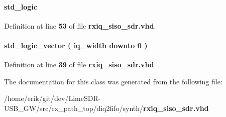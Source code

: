 \paragraph[{sdr\+\_\+fifo\+\_\+data\+\_\+valid}]{ {\bfseries \textcolor{comment}{std\+\_\+logic}\textcolor{vhdlchar}{ }} \hspace{0.3cm}{\ttfamily [Signal]}}\label{classrxiq__siso__sdr_1_1arch_a7daffe366926ac62978541e169b64978}


Definition at line {\bf 53} of file {\bf rxiq\+\_\+siso\+\_\+sdr.\+vhd}.

\paragraph[{sdr\+\_\+reg\+\_\+0}]{ {\bfseries \textcolor{comment}{std\+\_\+logic\+\_\+vector}\textcolor{vhdlchar}{ }\textcolor{vhdlchar}{(}\textcolor{vhdlchar}{ }\textcolor{vhdlchar}{ }\textcolor{vhdlchar}{ }\textcolor{vhdlchar}{ }{\bfseries {\bf iq\+\_\+width}} \textcolor{vhdlchar}{ }\textcolor{keywordflow}{downto}\textcolor{vhdlchar}{ }\textcolor{vhdlchar}{ } \textcolor{vhdldigit}{0} \textcolor{vhdlchar}{ }\textcolor{vhdlchar}{)}\textcolor{vhdlchar}{ }} \hspace{0.3cm}{\ttfamily [Signal]}}\label{classrxiq__siso__sdr_1_1arch_a7a051c45e86c2616c98e3137f6fd1857}


Definition at line {\bf 39} of file {\bf rxiq\+\_\+siso\+\_\+sdr.\+vhd}.



The documentation for this class was generated from the following file\+:\begin{DoxyCompactItemize}
\item 
/home/erik/git/dev/\+Lime\+S\+D\+R-\/\+U\+S\+B\+\_\+\+G\+W/src/rx\+\_\+path\+\_\+top/diq2fifo/synth/{\bf rxiq\+\_\+siso\+\_\+sdr.\+vhd}\end{DoxyCompactItemize}
